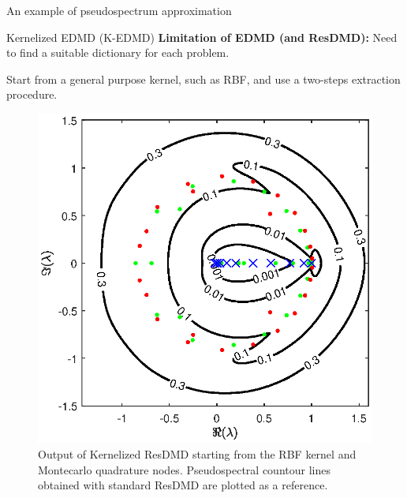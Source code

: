 \documentclass{beamer}
\begin{document}
\begin{frame}[fragile]{An example of pseudospectrum approximation}
\end{frame}


\begin{frame}{Kernelized EDMD (K-EDMD)}
\alert{\textbf{Limitation of EDMD (and ResDMD):}} Need to find a suitable dictionary for each problem.

\medskip
{} Start from a general purpose kernel, such as RBF, and use a two-steps extraction procedure.
\begin{figure}[h]
    \begin{center}
        \includegraphics[width=0.50\linewidth]{../code/figures/gauss_map/kernelized/presentation.eps}
    \end{center}
    \caption{Output of Kernelized ResDMD starting from the RBF kernel and Montecarlo quadrature nodes. Pseudospectral countour lines obtained with standard ResDMD are plotted as a reference.}
\end{figure}
\end{frame}
\end{document}
